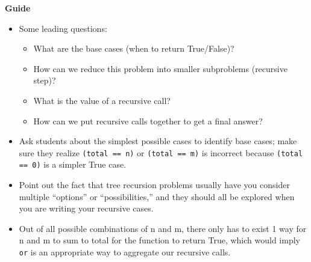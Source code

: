 \begin{blocksection}
\begin{guide}
\textbf{Guide}
\begin{itemize}
    \item Some leading questions:
    \begin{itemize}
        \item What are the base cases (when to return True/False)?
        \item How can we reduce this problem into smaller subproblems (recursive step)?
        \item What is the value of a recursive call?
        \item How can we put recursive calls together to get a final answer?
    \end{itemize}
    \item Ask students about the simplest possible cases to identify base cases; make sure they realize \lstinline{(total == n)} or \lstinline{(total == m)}  is incorrect because \lstinline{(total == 0)} is a simpler True case.
    \item Point out the fact that tree recursion problems usually have you consider multiple “options” or “possibilities,” and they should all be explored when you are writing your recursive cases.
    \item Out of all possible combinations of n and m, there only has to exist 1 way for n and m to sum to total for the function to return True, which would imply \lstinline{or} is an appropriate way to aggregate our recursive calls.

\end{itemize}
\end{guide}
\end{blocksection}
